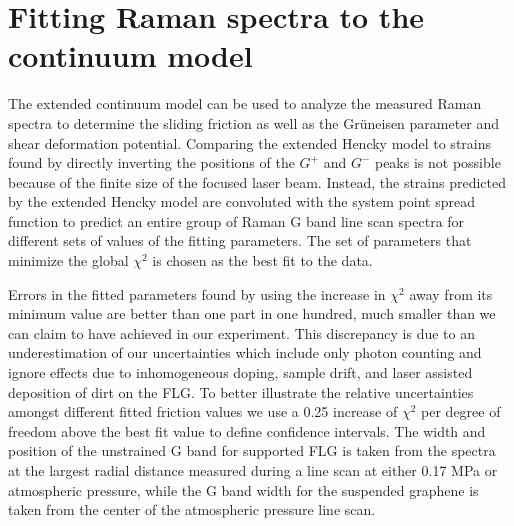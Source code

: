 \section{Fitting Raman spectra to the continuum model}
The extended continuum model can be used to analyze the measured Raman spectra to determine the sliding friction as well as the Gr\"{u}neisen parameter and shear deformation potential.
Comparing the extended Hencky model to strains found by directly inverting the positions of the $G^+$ and $G^-$ peaks is not possible because of the finite size of the focused laser beam.
Instead, the strains predicted by the extended Hencky model are convoluted with the system point spread function to predict an entire group of Raman G band line scan spectra for different sets of values of the fitting parameters.
The set of parameters that minimize the global $\chi^2$ is chosen as the best fit to the data.

Errors in the fitted parameters found by using the increase in $\chi^2$ away from its minimum value\cite{Press2007} are better than one part in one hundred, much smaller than we can claim to have achieved in our experiment.
This discrepancy is due to an underestimation of our uncertainties which include only photon counting and ignore effects due to inhomogeneous doping, sample drift, and laser assisted deposition of dirt on the FLG.
To better illustrate the relative uncertainties amongst different fitted friction values we use a 0.25 increase of $\chi^2$ per degree of freedom above the best fit value to define confidence intervals.
The width and position of the unstrained G band for supported FLG is taken from the spectra at the largest radial distance measured during a line scan at either 0.17 MPa or atmospheric pressure, while the G band width for the suspended graphene is taken from the center of the atmospheric pressure line scan.


